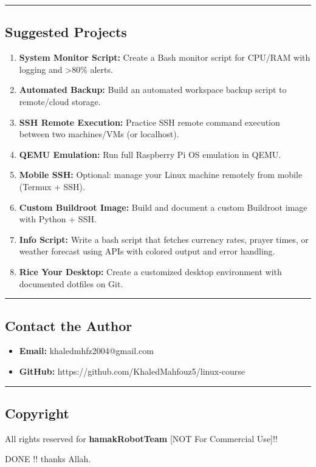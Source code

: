 \documentclass[
  english,
  paper=a4,
  oneside  ,captions=tableheading
]{scrartcl}
\providecommand{\tightlist}{%
  \setlength{\itemsep}{0pt}\setlength{\parskip}{0pt}}
\begin{document}
\begin{center}\rule{0.5\linewidth}{0.5pt}\end{center}

\subsection{Suggested Projects}\label{suggested-projects}

\begin{enumerate}
\def\labelenumi{\arabic{enumi}.}
\tightlist
\item
  \textbf{System Monitor Script:} Create a Bash monitor script for
  CPU/RAM with logging and \textgreater80\% alerts.
\item
  \textbf{Automated Backup:} Build an automated workspace backup script
  to remote/cloud storage.
\item
  \textbf{SSH Remote Execution:} Practice SSH remote command execution
  between two machines/VMs (or localhost).
\item
  \textbf{QEMU Emulation:} Run full Raspberry Pi OS emulation in QEMU.
\item
  \textbf{Mobile SSH:} Optional: manage your Linux machine remotely from
  mobile (Termux + SSH).
\item
  \textbf{Custom Buildroot Image:} Build and document a custom Buildroot
  image with Python + SSH.
\item
  \textbf{Info Script:} Write a bash script that fetches currency rates,
  prayer times, or weather forecast using APIs with colored output and
  error handling.
\item
  \textbf{Rice Your Desktop:} Create a customized desktop environment
  with documented dotfiles on Git.
\end{enumerate}

\begin{center}\rule{0.5\linewidth}{0.5pt}\end{center}

\subsection{Contact the Author}\label{contact-the-author}

\begin{itemize}
\tightlist
\item
  \textbf{Email:} khaledmhfz2004@gmail.com
\item
  \textbf{GitHub:} https://github.com/KhaledMahfouz5/linux-course
\end{itemize}

\begin{center}\rule{0.5\linewidth}{0.5pt}\end{center}

\subsection{Copyright}\label{copyright}

All rights reserved for \textbf{hamakRobotTeam} {[}NOT For Commercial
Use{]}!!

DONE !! thanks Allah.
\end{document}
